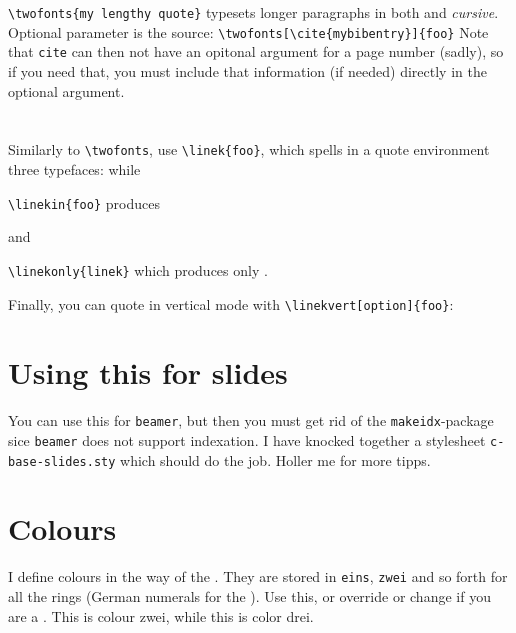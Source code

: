 \documentclass[14pt,ngerman]{extarticle}  %
\begin{document}
\verb|\twofonts{my lengthy quote}| typesets longer paragraphs in both  and \emph{cursive}. Optional parameter is the source: \verb|\twofonts[\cite{mybibentry}]{foo}| Note that \verb|cite| can then not have an opitonal argument for a page number (sadly), so if you need that, you must include that information (if needed) directly in the optional argument. 


\section{}

Similarly to \verb|\twofonts|, use \verb|\linek{foo}|, which spells in a quote environment three typefaces:
while

\verb|\linekin{foo}| produces 

and

\verb|\linekonly{linek}| which produces only 
.

Finally, you can quote  in vertical mode with \verb|\linekvert[option]{foo}|:


\section{Using this for slides}

You can use this for \verb|beamer|, but then you must get rid of the \verb|makeidx|-package sice \verb|beamer| does not support indexation. I have knocked together a stylesheet \verb|c-base-slides.sty| which should do the job. Holler me for more tipps.

\section{Colours}

I define colours in the way of the . They are stored in \verb|eins|, \verb|zwei| and so forth for all the rings (German numerals for the ). Use this, or override or change if you are a . {\color{zwei} This is colour zwei}, while {\color{drei} this is color drei}.

\begingroup %
\end{document}

